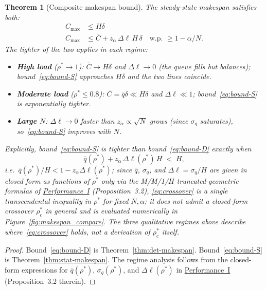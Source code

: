\documentclass[11pt,a4paper]{article}
\newtheorem{theorem}{Theorem}[section]
\newcommand{\rhostar}{\rho^{*}}
\newcommand{\qbar}{\bar{q}}
\newcommand{\Dl}{\Delta\ell}
\newcommand{\Cmax}{C_{\max}}
\newcommand{\Cbar}{\bar{C}}
\newcommand{\sigmaq}{\sigma_q}
\begin{document}
\begin{theorem}[Composite makespan bound]
\label{thm:composite}
The steady-state makespan satisfies both:
\begin{align}
  \Cmax &\leq H\delta
  \tag{D} \label{eq:bound-D}\\
  \Cmax &\leq \Cbar + z_\alpha\,\Dl\,H\,\delta
  \quad \text{w.p. } \geq 1-\alpha/N.
  \tag{S} \label{eq:bound-S}
\end{align}
The tighter of the two applies in each regime:
\begin{itemize}
  \item \textbf{High load} ($\rhostar \to 1$): $\Cbar \to H\delta$ and $\Dl \to 0$
        (the queue fills but balances); bound~\eqref{eq:bound-S} approaches
        $H\delta$ and the two lines coincide.
  \item \textbf{Moderate load} ($\rhostar \leq 0.8$): $\Cbar = \qbar\delta \ll H\delta$
        and $\Dl \ll 1$; bound~\eqref{eq:bound-S} is exponentially tighter.
  \item \textbf{Large $N$}: $\Dl \to 0$ faster than $z_\alpha \propto \sqrt{N}$ grows
        (since $\sigmaq$ saturates), so~\eqref{eq:bound-S} improves with $N$.
\end{itemize}
Explicitly, bound~\eqref{eq:bound-S} is tighter than
bound~\eqref{eq:bound-D} exactly when
\begin{equation}\label{eq:crossover}
  \qbar(\rhostar) + z_\alpha\,\Dl(\rhostar)\,H
  \;<\; H,
\end{equation}
i.e.\ $\qbar(\rhostar)/H < 1 - z_\alpha \Dl(\rhostar)$; since
$\qbar$, $\sigma_q$, and $\Dl = \sigma_q/H$ are given in closed form as
functions of $\rhostar$ only via the M/M/1/$H$ truncated-geometric
formulas of \hyperref[chap:load_balance]{Performance~I} (Proposition~3.2),
\eqref{eq:crossover} is a single transcendental inequality in $\rhostar$
for fixed $N, \alpha$; it does not admit a closed-form crossover
$\rhostar_c$ in general and is evaluated numerically in
Figure~\ref{fig:makespan_compare}. The three qualitative regimes
above describe where~\eqref{eq:crossover} holds, not a derivation of
$\rhostar_c$ itself.
\end{theorem}

\begin{proof}
Bound~\eqref{eq:bound-D} is Theorem~\ref{thm:det-makespan}.
Bound~\eqref{eq:bound-S} is Theorem~\ref{thm:stat-makespan}.
The regime analysis follows from the closed-form expressions for
$\qbar(\rhostar)$, $\sigmaq(\rhostar)$, and $\Dl(\rhostar)$ in
\hyperref[chap:load_balance]{Performance~I} (Proposition~3.2 therein).
\end{proof}
\end{document}
